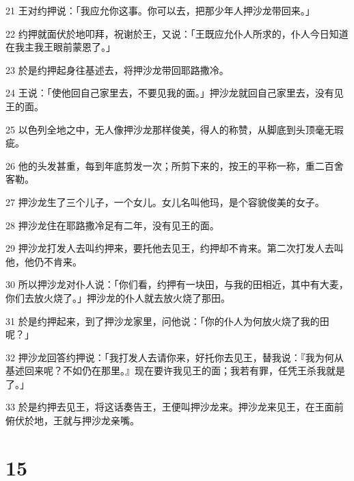 \par 21 王对约押说：「我应允你这事。你可以去，把那少年人押沙龙带回来。」
\par 22 约押就面伏於地叩拜，祝谢於王，又说：「王既应允仆人所求的，仆人今日知道在我主我王眼前蒙恩了。」
\par 23 於是约押起身往基述去，将押沙龙带回耶路撒冷。
\par 24 王说：「使他回自己家里去，不要见我的面。」押沙龙就回自己家里去，没有见王的面。
\par 25 以色列全地之中，无人像押沙龙那样俊美，得人的称赞，从脚底到头顶毫无瑕疵。
\par 26 他的头发甚重，每到年底剪发一次；所剪下来的，按王的平称一称，重二百舍客勒。
\par 27 押沙龙生了三个儿子，一个女儿。女儿名叫他玛，是个容貌俊美的女子。
\par 28 押沙龙住在耶路撒冷足有二年，没有见王的面。
\par 29 押沙龙打发人去叫约押来，要托他去见王，约押却不肯来。第二次打发人去叫他，他仍不肯来。
\par 30 所以押沙龙对仆人说：「你们看，约押有一块田，与我的田相近，其中有大麦，你们去放火烧了。」押沙龙的仆人就去放火烧了那田。
\par 31 於是约押起来，到了押沙龙家里，问他说：「你的仆人为何放火烧了我的田呢？」
\par 32 押沙龙回答约押说：「我打发人去请你来，好托你去见王，替我说：『我为何从基述回来呢？不如仍在那里。』现在要许我见王的面；我若有罪，任凭王杀我就是了。」
\par 33 於是约押去见王，将这话奏告王，王便叫押沙龙来。押沙龙来见王，在王面前俯伏於地，王就与押沙龙亲嘴。

\chapter{15}

